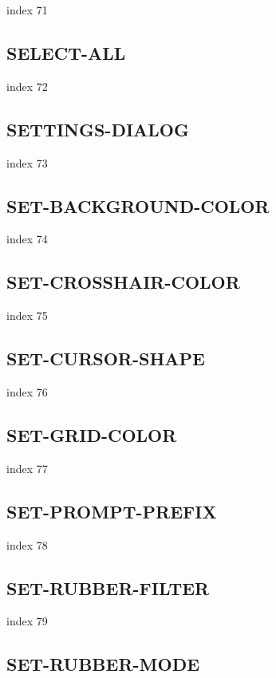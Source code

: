 \documentclass[a4paper]{report}
\begin{document}
{{{{{{{{{{{{{index 71

\subsection{SELECT-ALL}

index 72

\subsection{SETTINGS-DIALOG}

index 73

\subsection{SET-BACKGROUND-COLOR}

index 74

\subsection{SET-CROSSHAIR-COLOR}

index 75

\subsection{SET-CURSOR-SHAPE}

index 76

\subsection{SET-GRID-COLOR}

index 77

\subsection{SET-PROMPT-PREFIX}

index 78

\subsection{SET-RUBBER-FILTER}

index 79

\subsection{SET-RUBBER-MODE}

}}}}}}}}}}}}}
\end{document}
